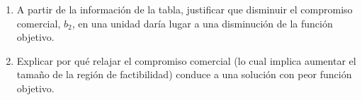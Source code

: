 \begin{enumerate}
\item A partir de la información de la tabla, justificar que disminuir el compromiso comercial, $b_2$, en una unidad daría lugar a una disminución de la función objetivo.

\item Explicar por qué relajar el compromiso comercial (lo cual implica aumentar el tamaño de la región de factibilidad) conduce a una solución con peor función objetivo.
\end{enumerate}